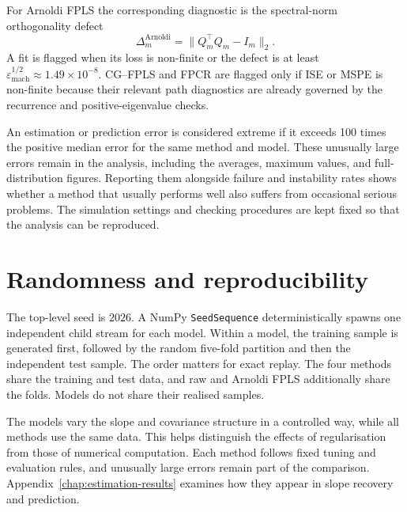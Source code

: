 For Arnoldi FPLS the corresponding diagnostic is the spectral-norm
orthogonality defect
\begin{equation}
    \Delta_m^{\mathrm{Arnoldi}}
    =\|Q_m^\top Q_m-I_m\|_2.
    \label{eq:simulation-arnoldi-defect}
\end{equation}
A fit is flagged when its loss is non-finite or the defect is at least
$\varepsilon_{\mathrm{mach}}^{1/2}\approx1.49\times10^{-8}$.  CG--FPLS and
FPCR are flagged only if ISE or MSPE is non-finite because their relevant path
diagnostics are already governed by the recurrence and positive-eigenvalue
checks.

An estimation or prediction error is considered extreme if it exceeds 100 times the positive median error for the same method and model. These unusually large errors remain in the analysis, including the averages, maximum values, and full-distribution figures. Reporting them alongside failure and instability rates shows whether a method that usually performs well also suffers from occasional serious problems. The simulation settings and checking procedures are kept fixed so that the analysis can be reproduced.

\section{Randomness and reproducibility}
\label{sec:simulation-reproducibility}

The top-level seed is $2026$.  A NumPy \texttt{SeedSequence} deterministically
spawns one independent child stream for each model.  Within a model, the
training sample is generated first, followed by the random five-fold
partition and then the independent test sample.  The order matters for exact
replay.  The four methods share the training and test data, and raw and
Arnoldi FPLS additionally share the folds.  Models do not share their realised
samples.


The models vary the slope and covariance structure in a controlled way, while all methods use the same data. This helps distinguish the effects of regularisation from those of numerical computation. Each method follows fixed tuning and evaluation rules, and unusually large errors remain part of the comparison.
Appendix~\ref{chap:estimation-results} examines how they appear in
slope recovery and prediction.
